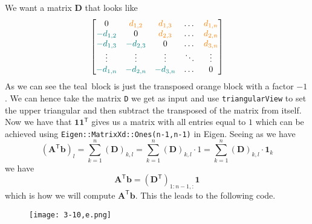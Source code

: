 \documentclass{article}
\begin{document}
\noindent We want a matrix $\mathbf{D}$ that looks like
\begin{equation*}
    \begin{bmatrix}
          0 & \color{orange}d_{1,2}\color{black} & \color{orange}d_{1,3}\color{orange} & \dots & \color{orange}d_{1,n}\color{black} \\
        \color{teal}-d_{1,2}\color{black} & 0 & \color{orange}d_{2,3}\color{black} & \dots & \color{orange}d_{2,n}\color{black} \\
        \color{teal}-d_{1,3}\color{black} & \color{teal}-d_{2,3}\color{black} & 0 & \dots & \color{orange}d_{3,n}\color{black}\\
        \vdots & \vdots & \vdots & \ddots& \vdots \\
         
        \color{teal}-d_{1,n}\color{black} & \color{teal}-d_{2,n}\color{black} & \color{teal}-d_{3,n}\color{black} & \dots & 0
    \end{bmatrix}
\end{equation*}
As we can see the \color{teal}teal\color{black}\, block is just the transposed \color{orange} orange \color{black} block with a factor $-1$. We can hence take the matrix \verb|D| we get as input and use \verb|triangularView| to set the upper triangular and then subtract the transposed of the matrix from itself. Now we have that $\mathbf{1}\mathbf{1}^{\mathsf{T}}$ gives us a matrix with all entries equal to $1$ which can be achieved using \verb|Eigen::MatrixXd::Ones(n-1,n-1)| in Eigen. Seeing as we have
\begin{equation*}
    \left(\mathbf{A}^{\mathsf{T}}\mathbf{b}\right)_{l} = \sum_{k=1}^{n}\left(\mathbf{D}\right)_{k,l} = \sum_{k=1}^{n}\left(\mathbf{D}\right)_{k,l} \cdot 1 = \sum_{k=1}^{n}\left(\mathbf{D}\right)_{k,l} \cdot \mathbf{1}_{k}
\end{equation*}
we have 
\begin{equation*}
    \mathbf{A}^{\mathsf{T}}\mathbf{b}  = \left(\mathbf{D}^{\mathsf{T}}\right)_{1:n-1, :}\mathbf{1}
\end{equation*}
which is how we will compute $\mathbf{A}^{\mathsf{T}}\mathbf{b} $. This the leads to the following code.

\begin{figure}[!hbt]
    \centering
\texttt{[image: 3-10,e.png]}
\end{figure}
\end{document}
